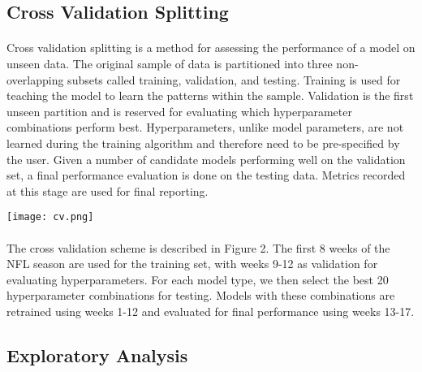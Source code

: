 \documentclass[11pt]{article}
\newenvironment{Figure}
  {\par\medskip\noindent\minipage{\linewidth}}
  {\endminipage\par\medskip}
\begin{document}
\begin{multicols*}{2}
        \subsection{Cross Validation Splitting}
            \paragraph{}
                Cross validation splitting is a method for assessing the performance of a model on unseen data. 
                The original sample of data is partitioned into three non-overlapping subsets called training, validation, and testing.
                Training is used for teaching the model to learn the patterns within the sample. 
                Validation is the first unseen partition and is reserved for evaluating which hyperparameter combinations perform best. 
                Hyperparameters, unlike model parameters, are not learned during the training algorithm and therefore need to be pre-specified by the user.
                Given a number of candidate models performing well on the validation set, a final performance evaluation is done on the testing data. 
                Metrics recorded at this stage are used for final reporting.

            \vspace{10pt}
                
            \begin{Figure}  
                \centering
                \texttt{[image: cv.png]}
                \label{fig:Cross Validation Splitting}
            \end{Figure}

            \vspace{-10pt}

            \paragraph{}
                The cross validation scheme is described in Figure 2.
                The first 8 weeks of the NFL season are used for the training set, with weeks 9-12 as validation for evaluating hyperparameters.
                For each model type, we then select the best 20 hyperparameter combinations for testing. 
                Models with these combinations are retrained using weeks 1-12 and evaluated for final performance using weeks 13-17. 

        \subsection{Exploratory Analysis}

\end{multicols*}
\end{document}
